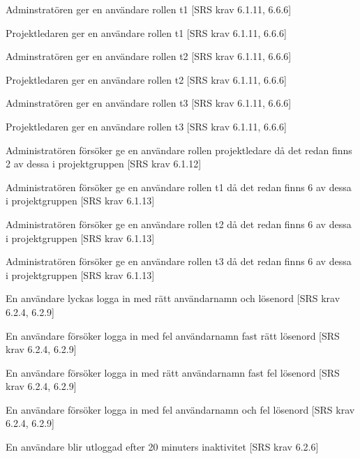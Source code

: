 \documentclass[a4paper]{article}
\begin{document}
\begin{appendices}
\begin{FT}
\item
Adminstratören ger en användare rollen t1 [SRS krav 6.1.11, 6.6.6]

\item
Projektledaren ger en användare rollen t1 [SRS krav 6.1.11, 6.6.6]

\item
Adminstratören ger en användare rollen t2 [SRS krav 6.1.11, 6.6.6]

\item
Projektledaren ger en användare rollen t2 [SRS krav 6.1.11, 6.6.6]

\item
Adminstratören ger en användare rollen t3 [SRS krav 6.1.11, 6.6.6]

\item
Projektledaren ger en användare rollen t3 [SRS krav 6.1.11, 6.6.6]

\item
Administratören försöker ge en användare rollen projektledare då det redan finns 2 av dessa i projektgruppen [SRS krav 6.1.12]

\item
Administratören försöker ge en användare rollen t1 då det redan finns 6 av dessa i projektgruppen [SRS krav 6.1.13]

\item
Administratören försöker ge en användare rollen t2 då det redan finns 6 av dessa i projektgruppen [SRS krav 6.1.13]

\item
Administratören försöker ge en användare rollen t3 då det redan finns 6 av dessa i projektgruppen [SRS krav 6.1.13]

\item
En användare lyckas logga in med rätt användarnamn och lösenord [SRS krav 6.2.4, 6.2.9]

\item
En användare försöker logga in med fel användarnamn fast rätt lösenord [SRS krav 6.2.4, 6.2.9]

\item
En användare försöker logga in med rätt användarnamn fast fel lösenord [SRS krav 6.2.4, 6.2.9]

\item
En användare försöker logga in med fel användarnamn och fel lösenord [SRS krav 6.2.4, 6.2.9]

\item 
En användare blir utloggad efter 20 minuters inaktivitet [SRS krav 6.2.6]


\end{FT}
\end{appendices}
\end{document}
